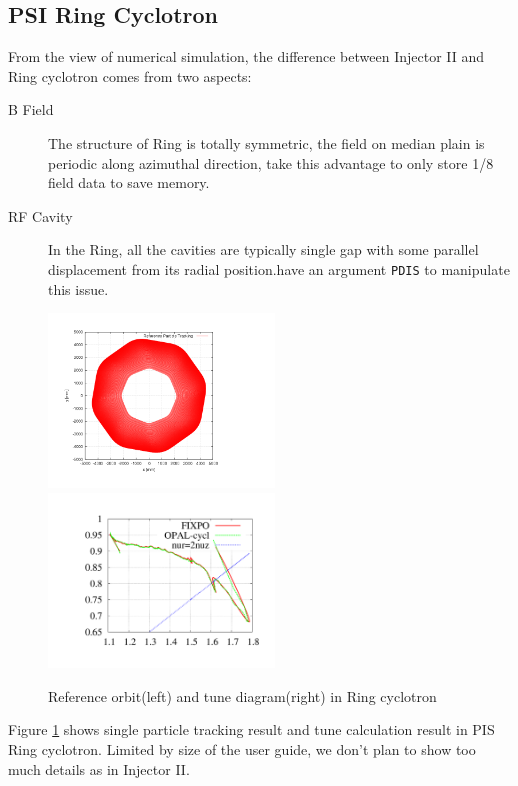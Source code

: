 \subsection{PSI  Ring Cyclotron}
\label{sec:Ring}
From the view of numerical simulation, the difference between Injector II and Ring cyclotron comes from two aspects:
\begin{description}
\item[B Field] The structure of Ring is totally symmetric, the field on median plain is periodic 
along azimuthal direction, \opalcycl take this advantage to only store 1/8 field data to save memory.

\item[RF Cavity] In the Ring, all the cavities are typically single gap with some parallel displacement from its
radial position.\opalcycl have an argument \texttt{PDIS} to manipulate this issue.  
\end{description}
\begin{figure}[ht]
  \begin{center} 
    \includegraphics[width=6cm,trim=2.5cm 2.5cm 2.5cm 2.5cm]{figures/cyclotron/AEO_Ring.png}
    \includegraphics[width=6cm,trim=2.5cm 2.5cm 2.5cm 2.5cm]{figures/cyclotron/nurnuz_Ring}
    \caption{Reference orbit(left) and tune diagram(right) in Ring cyclotron }
    \label{fig:Ring reference orbit and tune}
  \end{center}
\end{figure}
Figure \ref{fig:Ring reference orbit and tune} shows single particle tracking result and tune calculation result in PIS Ring cyclotron.
Limited by size of the user guide, we don't plan to show too much details as in Injector II.

